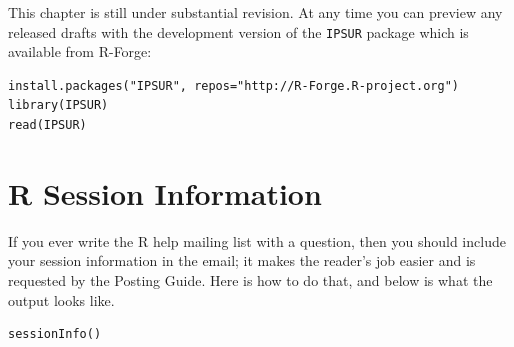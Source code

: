 \documentclass[captions=tableheading]{scrbook}
\begin{document}
This chapter is still under substantial revision. At any time you can preview any released drafts with the development version of the \texttt{IPSUR} package which is available from \textsf{R}-Forge:


\begin{verbatim}
install.packages("IPSUR", repos="http://R-Forge.R-project.org")
library(IPSUR)
read(IPSUR)
\end{verbatim}





\appendix
\chapter{\textsf{R} Session Information}
\label{sec-17}

\label{cha:R-Session-Information}

If you ever write the \textsf{R} help mailing list with a question, then you should include your session information in the email; it makes the reader's job easier and is requested by the Posting Guide. Here is how to do that, and below is what the output looks like.


\begin{verbatim}
sessionInfo()
\end{verbatim}
\end{document}
